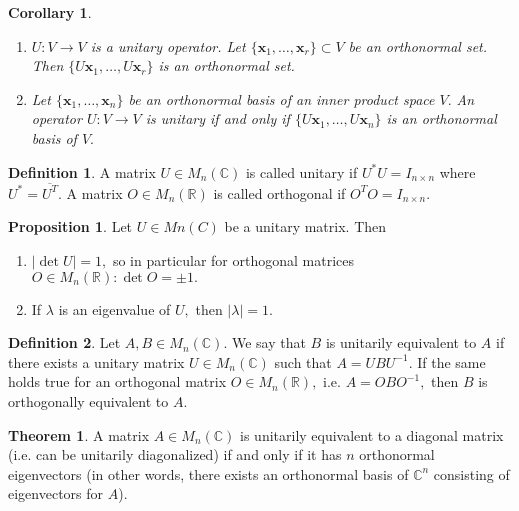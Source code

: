 \documentclass[12pt, a4paper]{article}
\newcommand{\bb}[1]{\mathbb{#1}}
\newcommand{\mb}[1]{\mathbf{#1}}
\theoremstyle{definition}
\newtheorem{definition}{Definition}[section]
\newtheorem{theorem}{Theorem}[section]
\newtheorem{proposition}{Proposition}
\theoremstyle{plain}
\newtheorem{corollary}{Corollary}[theorem]
\begin{document}
\begin{corollary}
\begin{enumerate}
	
	\item $U : V \to V$ is a unitary operator. Let $\{\mb{x}_1,\ldots,\mb{x}_r\} \subset V$ be an orthonormal set. Then $\{U\mb{x}_1,\ldots, U\mb{x}_r\}$ is an orthonormal set.

	\item Let $\{\mb{x}_1,\ldots, \mb{x}_n\}$ be an orthonormal basis of an inner product space $V .$ An operator $U : V \to V$ is unitary if and only if $\{U\mb{x}_1,\ldots,U\mb{x}_n\}$ is an orthonormal basis of $V.$

\end{enumerate}
\end{corollary}

\begin{definition}
 A matrix $U \in M_n(\bb{C})$ is called unitary if $U^*U = I_{n\times n}$ where $U^* = \overline{U^T}.$ A matrix $O \in M_n(\bb{R})$ is called orthogonal if $O^TO = I_{n\times n} .$
\end{definition}

\begin{proposition}
Let $U \in Mn(C)$ be a unitary matrix. Then
\begin{enumerate}
	
	\item $|\det U| = 1,$ so in particular for orthogonal matrices $O \in M_n(\bb{R}) : \det O = \pm1.$

	\item If $\lambda$ is an eigenvalue of $U,$ then $|\lambda| = 1.$

\end{enumerate}
\end{proposition}

\begin{definition} 
Let $A,B \in M_n(\bb{C}).$ We say that $B$ is unitarily equivalent to $A$ if there exists a unitary matrix $U \in M_n(\bb{C})$ such that $A = UBU^{-1}.$ If the same holds true for an orthogonal matrix $O \in M_n(\bb{R}),$ i.e. $A = OBO^{-1},$ then $B$ is orthogonally equivalent to $A.$
\end{definition}

\begin{theorem}
A matrix $A \in M_n(\bb{C})$ is unitarily equivalent to a diagonal matrix (i.e. can be unitarily diagonalized) if and only if it has $n$ orthonormal eigenvectors (in other words, there exists an orthonormal basis of $\bb{C}^n$ consisting of eigenvectors for $A$).
\end{theorem}
\end{document}
